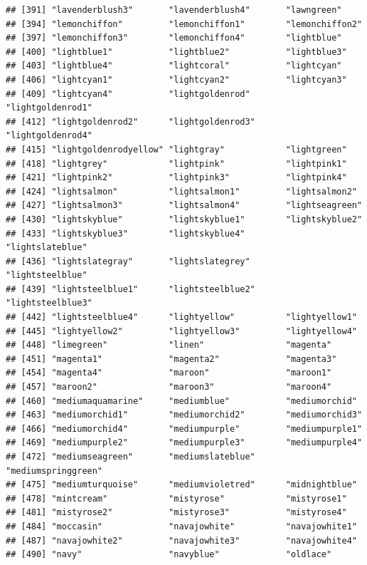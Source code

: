 \documentclass[]{book}
\begin{document}
\begin{verbatim}
## [391] "lavenderblush3"       "lavenderblush4"       "lawngreen"           
## [394] "lemonchiffon"         "lemonchiffon1"        "lemonchiffon2"       
## [397] "lemonchiffon3"        "lemonchiffon4"        "lightblue"           
## [400] "lightblue1"           "lightblue2"           "lightblue3"          
## [403] "lightblue4"           "lightcoral"           "lightcyan"           
## [406] "lightcyan1"           "lightcyan2"           "lightcyan3"          
## [409] "lightcyan4"           "lightgoldenrod"       "lightgoldenrod1"     
## [412] "lightgoldenrod2"      "lightgoldenrod3"      "lightgoldenrod4"     
## [415] "lightgoldenrodyellow" "lightgray"            "lightgreen"          
## [418] "lightgrey"            "lightpink"            "lightpink1"          
## [421] "lightpink2"           "lightpink3"           "lightpink4"          
## [424] "lightsalmon"          "lightsalmon1"         "lightsalmon2"        
## [427] "lightsalmon3"         "lightsalmon4"         "lightseagreen"       
## [430] "lightskyblue"         "lightskyblue1"        "lightskyblue2"       
## [433] "lightskyblue3"        "lightskyblue4"        "lightslateblue"      
## [436] "lightslategray"       "lightslategrey"       "lightsteelblue"      
## [439] "lightsteelblue1"      "lightsteelblue2"      "lightsteelblue3"     
## [442] "lightsteelblue4"      "lightyellow"          "lightyellow1"        
## [445] "lightyellow2"         "lightyellow3"         "lightyellow4"        
## [448] "limegreen"            "linen"                "magenta"             
## [451] "magenta1"             "magenta2"             "magenta3"            
## [454] "magenta4"             "maroon"               "maroon1"             
## [457] "maroon2"              "maroon3"              "maroon4"             
## [460] "mediumaquamarine"     "mediumblue"           "mediumorchid"        
## [463] "mediumorchid1"        "mediumorchid2"        "mediumorchid3"       
## [466] "mediumorchid4"        "mediumpurple"         "mediumpurple1"       
## [469] "mediumpurple2"        "mediumpurple3"        "mediumpurple4"       
## [472] "mediumseagreen"       "mediumslateblue"      "mediumspringgreen"   
## [475] "mediumturquoise"      "mediumvioletred"      "midnightblue"        
## [478] "mintcream"            "mistyrose"            "mistyrose1"          
## [481] "mistyrose2"           "mistyrose3"           "mistyrose4"          
## [484] "moccasin"             "navajowhite"          "navajowhite1"        
## [487] "navajowhite2"         "navajowhite3"         "navajowhite4"        
## [490] "navy"                 "navyblue"             "oldlace"             

\end{verbatim}
\end{document}
